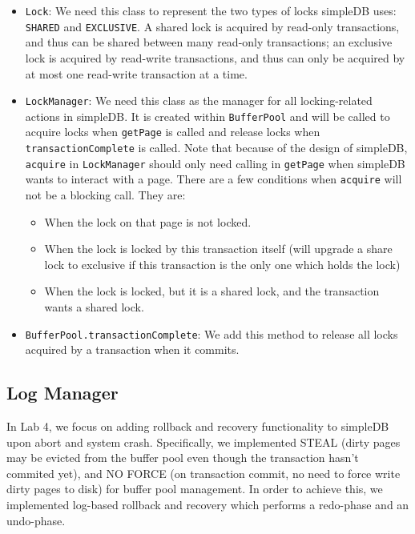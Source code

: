 \documentclass[12pt]{myland}
\begin{document}
	\begin{itemize}
        \item \texttt{Lock}: We need this class to represent the two types of locks simpleDB uses: \texttt{SHARED} and
            \texttt{EXCLUSIVE}. A shared lock is acquired by read-only transactions, and thus can be shared between
            many read-only transactions; an exclusive lock is acquired by read-write transactions, and thus can only be
            acquired by at most one read-write transaction at a time.
        \item \texttt{LockManager}: We need this class as the manager for all locking-related actions in simpleDB. It
            is created within \texttt{BufferPool} and will be called to acquire locks when \texttt{getPage} is called
            and release locks when \texttt{transactionComplete} is called. Note that because of the design of simpleDB,
            \texttt{acquire} in \texttt{LockManager} should only need calling in \texttt{getPage} when simpleDB wants to
            interact with a page. There are a few conditions when \texttt{acquire} will not be a blocking call. They are:
                \begin{itemize}
                    \item When the lock on that page is not locked.
                    \item When the lock is locked by this transaction itself (will upgrade a share lock to
                        exclusive if this transaction is the only one which holds the lock)
                    \item When the lock is locked, but it is a shared lock, and the transaction wants a shared lock.
                \end{itemize}
        \item \texttt{BufferPool.transactionComplete}: We add this method to release all locks acquired by a
            transaction when it commits.
	\end{itemize}

    \subsection{Log Manager}
    In Lab 4, we focus on adding rollback and recovery functionality to simpleDB upon abort and system crash.
    Specifically, we implemented STEAL (dirty pages may be evicted from the buffer pool even though the transaction
    hasn't commited yet), and NO FORCE (on transaction commit, no need to force write dirty pages to disk) for buffer
    pool management. In order to achieve this, we implemented log-based rollback and recovery which performs a
    redo-phase and an undo-phase. \par
\end{document}
